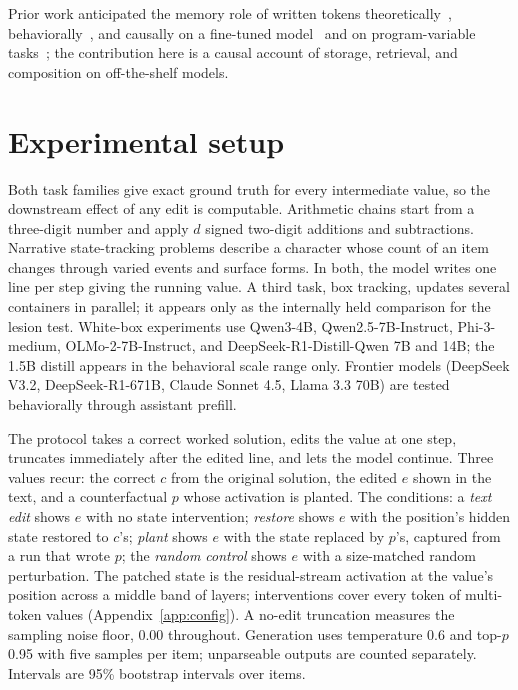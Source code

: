 \documentclass{article}
\begin{document}
Prior work anticipated the memory role of written tokens theoretically~\citep{merrill2024expressive}, behaviorally~\citep{lanchantin2023selfnotes}, and causally on a fine-tuned model~\citep{shih2026registers} and on program-variable tasks~\citep{zhu2025variables}; the contribution here is a causal account of storage, retrieval, and composition on off-the-shelf models.

\section{Experimental setup}

Both task families give exact ground truth for every intermediate value, so the downstream effect of any edit is computable. Arithmetic chains start from a three-digit number and apply $d$ signed two-digit additions and subtractions. Narrative state-tracking problems describe a character whose count of an item changes through varied events and surface forms. In both, the model writes one line per step giving the running value. A third task, box tracking, updates several containers in parallel; it appears only as the internally held comparison for the lesion test. White-box experiments use Qwen3-4B, Qwen2.5-7B-Instruct, Phi-3-medium, OLMo-2-7B-Instruct, and DeepSeek-R1-Distill-Qwen 7B and 14B; the 1.5B distill appears in the behavioral scale range only. Frontier models (DeepSeek V3.2, DeepSeek-R1-671B, Claude Sonnet 4.5, Llama 3.3 70B) are tested behaviorally through assistant prefill.

The protocol takes a correct worked solution, edits the value at one step, truncates immediately after the edited line, and lets the model continue. Three values recur: the correct $c$ from the original solution, the edited $e$ shown in the text, and a counterfactual $p$ whose activation is planted. The conditions: a \emph{text edit} shows $e$ with no state intervention; \emph{restore} shows $e$ with the position's hidden state restored to $c$'s; \emph{plant} shows $e$ with the state replaced by $p$'s, captured from a run that wrote $p$; the \emph{random control} shows $e$ with a size-matched random perturbation. The patched state is the residual-stream activation at the value's position across a middle band of layers; interventions cover every token of multi-token values (Appendix~\ref{app:config}). A no-edit truncation measures the sampling noise floor, 0.00 throughout. Generation uses temperature 0.6 and top-$p$ 0.95 with five samples per item; unparseable outputs are counted separately. Intervals are 95\% bootstrap intervals over items.
\end{document}

